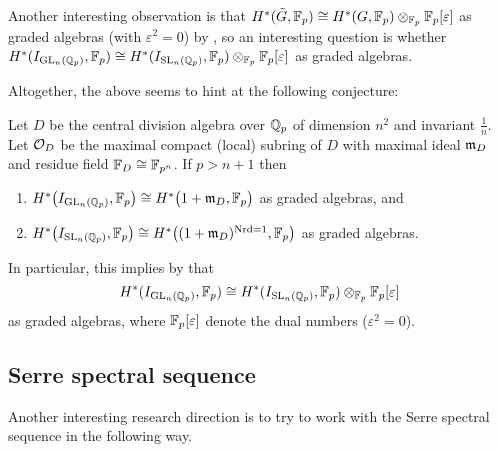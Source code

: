 Another interesting observation is that $H^{*}(\tilde{G},\mathbb{F}_{p}) \cong H^{*}(G,\mathbb{F}_{p}) \otimes_{\mathbb{F}_{p}} \mathbb{F}_{p}[\varepsilon]$ as graded algebras (with $\varepsilon^{2} = 0$) by \cite[Sect.~6.3]{Sor}, so an interesting question is whether $H^{*}(I_{\operatorname{GL}_{n}(\mathbb{Q}_{p})},\mathbb{F}_{p}) \cong H^{*}(I_{\operatorname{SL}_{n}(\mathbb{Q}_{p})},\mathbb{F}_{p}) \otimes_{\mathbb{F}_{p}} \mathbb{F}_{p}[\varepsilon]$ as graded algebras.

Altogether, the above seems to hint at the following conjecture:

\begin{conjecture}
  Let $D$ be the central division algebra over $\mathbb{Q}_{p}$ of dimension $n^{2}$ and invariant $\frac{1}{n}$. Let $\mathcal{O}_{D}$ be the maximal compact (local) subring of $D$ with maximal ideal $\mathfrak{m}_{D}$ and residue field $\mathbb{F}_{D} \cong \mathbb{F}_{p^{n}}$. If $p > n+1$ then
  \begin{enumerate}[$\bullet$]
    \item $H^{*}\bigl( I_{\operatorname{GL}_{n}(\mathbb{Q}_{p})}, \mathbb{F}_{p} \bigr) \cong H^{*}\bigl( 1+\mathfrak{m}_{D}, \mathbb{F}_{p} \bigr)$ as graded algebras, and
    \item $H^{*}\bigl( I_{\operatorname{SL}_{n}(\mathbb{Q}_{p})}, \mathbb{F}_{p} \bigr) \cong H^{*}\bigl( (1+\mathfrak{m}_{D})^{\operatorname{Nrd} = 1}, \mathbb{F}_{p} \bigr)$ as graded algebras.
  \end{enumerate}
  In particular, this implies by \cite[Sect.~6.3]{Sor} that \[ H^{*}( I_{\operatorname{GL}_{n}(\mathbb{Q}_{p})}, \mathbb{F}_{p} ) \cong H^{*}( I_{\operatorname{SL}_{n}(\mathbb{Q}_{p})}, \mathbb{F}_{p} ) \otimes_{\mathbb{F}_{p}} \mathbb{F}_{p}[\varepsilon] \] as graded algebras, where $\mathbb{F}_{p}[\varepsilon]$ denote the dual numbers ($\varepsilon^{2} = 0$).
\end{conjecture}

\subsection{Serre spectral sequence}%
\label{subsec:Serre-spec-seq}

Another interesting research direction is to try to work with the Serre spectral sequence in the following way.

